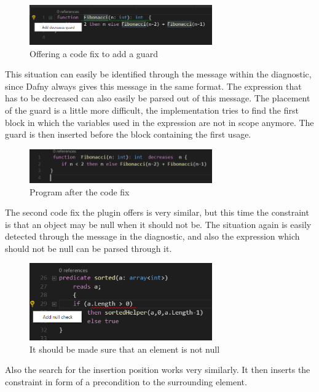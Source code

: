   \begin{figure}[H]
	\centering
	\includegraphics[width=0.7\textwidth]{img/decreaseGuard}
	\caption{Offering a code fix to add a guard}
	\label{fig:decreaseguard}
\end{figure}
This situation can easily be identified through the message within the diagnostic, since Dafny always gives this message in the same format. The expression that has to be decreased can also easily be parsed out of this message. The placement of the guard is a little more difficult, the implementation tries to find the first block in which the variables used in the expression are not in scope anymore. The guard is then inserted before the block containing the first usage. \newline
  \begin{figure}[H]
	\centering
	\includegraphics[width=0.7\textwidth]{img/decreaseGuardApplied}
	\caption{Program after the code fix}
	\label{fig:decreaseguardapplied}
\end{figure}
The second code fix the plugin offers is very similar, but this time the constraint is that an object may be null when it should not be. The situation again is easily detected through the message in the diagnostic, and also the expression which should not be null can be parsed through it.
  \begin{figure}[H]
	\centering
	\includegraphics[width=0.7\textwidth]{img/nullCheck}
	\caption{It should be made sure that an element is not null}
	\label{fig:nullcheck}
\end{figure}
Also the search for the insertion position works very similarly. It then inserts the constraint in form of a precondition to the surrounding element. \newline
